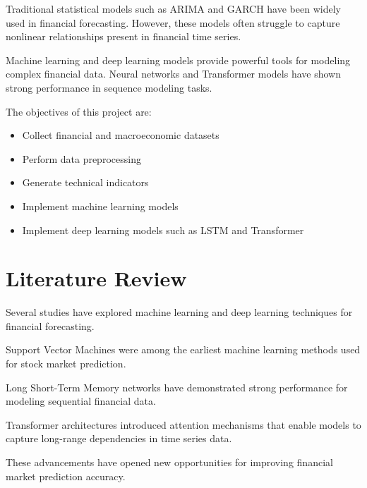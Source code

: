\documentclass[12pt]{article}
\begin{document}
Traditional statistical models such as ARIMA and GARCH have been widely used in financial forecasting. However, these models often struggle to capture nonlinear relationships present in financial time series.

Machine learning and deep learning models provide powerful tools for modeling complex financial data. Neural networks and Transformer models have shown strong performance in sequence modeling tasks.

The objectives of this project are:

\begin{itemize}

\item Collect financial and macroeconomic datasets

\item Perform data preprocessing

\item Generate technical indicators

\item Implement machine learning models

\item Implement deep learning models such as LSTM and Transformer

\end{itemize}


\newpage
\section{Literature Review}

Several studies have explored machine learning and deep learning techniques for financial forecasting.

Support Vector Machines were among the earliest machine learning methods used for stock market prediction.

Long Short-Term Memory networks have demonstrated strong performance for modeling sequential financial data.

Transformer architectures introduced attention mechanisms that enable models to capture long-range dependencies in time series data.

These advancements have opened new opportunities for improving financial market prediction accuracy.

\end{document}
